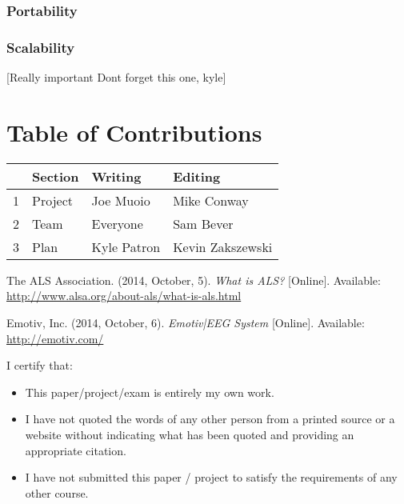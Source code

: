 \documentclass{report}
\begin{document}
\subsubsection{Portability}

\subsubsection{Scalability}
[Really important Dont forget this one, kyle]


\newpage
\section*{\centering Table of Contributions}
\begin{tabular}{| l | l | l | l |}
    \hline
     & Section & Writing & Editing \\
    \hline \hline
    1 & Project & Joe Muoio  & Mike Conway \\ \hline
    2 & Team & Everyone & Sam Bever \\ \hline
    3 & Plan & Kyle Patron & Kevin Zakszewski \\ \hline
\end{tabular}
\begin{thebibliography}{1}

     The ALS Association. (2014, October, 5). \textit{What
        is ALS?} [Online]. Available:
        \url{http://www.alsa.org/about-als/what-is-als.html}
 
     Emotiv, Inc. (2014, October, 6). \textit{Emotiv|EEG
        System} [Online]. Available: \url{http://emotiv.com/}

\end{thebibliography}
\newpage
\noindent I certify that:
\begin{itemize}
\item This paper/project/exam is entirely my own work.
\item I have not quoted the words of any other person from a printed source or a website without indicating what has been quoted and providing an appropriate citation.
\item I have not submitted this paper / project to satisfy the requirements of any other course.
\end{itemize}

\vspace{1cm}
\noindent{}
\end{document}
